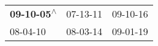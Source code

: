 \begin{supertabular}{lll}
 \textbf{09-10-05\textsuperscript{$\wedge$}} &  07-13-11\textsuperscript{} &  09-10-16\textsuperscript{} \\
                  08-04-10\textsuperscript{} &  08-03-14\textsuperscript{} &  09-01-19\textsuperscript{} \\
\end{supertabular}
